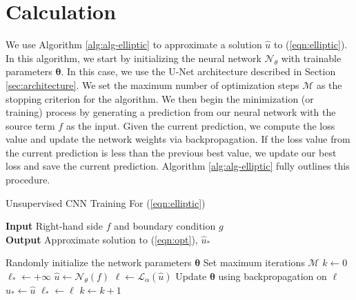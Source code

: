 \documentclass[preprint,12pt]{elsarticle}
\newcommand{\bftheta}{\boldsymbol{\theta}}
\begin{document}
\section{Calculation} \label{sec:calculation}
We use Algorithm \ref{alg:alg-elliptic} to approximate a solution $\hat{u}$ to (\ref{eqn:elliptic}). In this algorithm, we start by initializing the neural network $\mathcal{N}_{\theta}$ with trainable parameters $\bftheta$. In this case, we use the U-Net architecture described in Section \ref{sec:architecture}. We set the maximum number of optimization steps $\mathcal{M}$ as the stopping criterion for the algorithm. We then begin the minimization (or training) process by generating a prediction from our neural network with the source term $f$ as the input. Given the current prediction, we compute the loss value and update the network weights via backpropagation. If the loss value from the current prediction is less than the previous best value, we update our best loss and save the current prediction. Algorithm \ref{alg:alg-elliptic} fully outlines this procedure.

\begin{algorithm}[ht!]
\caption{Unsupervised CNN Training For (\ref{eqn:elliptic}) \label{alg:alg-elliptic}}
 \hspace*{\algorithmicindent} \textbf{Input} Right-hand side $f$ and boundary condition $g$ \\
 \hspace*{\algorithmicindent} \textbf{Output} Approximate solution to (\ref{eqn:opt}), $\hat{u}_*$
\begin{algorithmic}[1]
\State Randomly initialize the network parameters $\bftheta$
\State Set maximum iterations $\mathcal{M}$
\State $k \gets 0$ 
\State $\ell_* \gets +\infty$ 
\State $\hat{u} \gets \mathcal{N}_{\theta}(f)$ 
\State $\ell \gets \mathcal{L}_{\alpha}(\hat{u})$ 
\State Update $\bftheta$ using backpropagation on $\ell$
\If{$\ell < \ell_*$}
\State $\hat{u}_* \gets \hat{u}$ 
\State $\ell_* \gets \ell$ 
\EndIf
\State $k \gets k+1$
\EndWhile
\end{algorithmic}
\end{algorithm}
\end{document}
